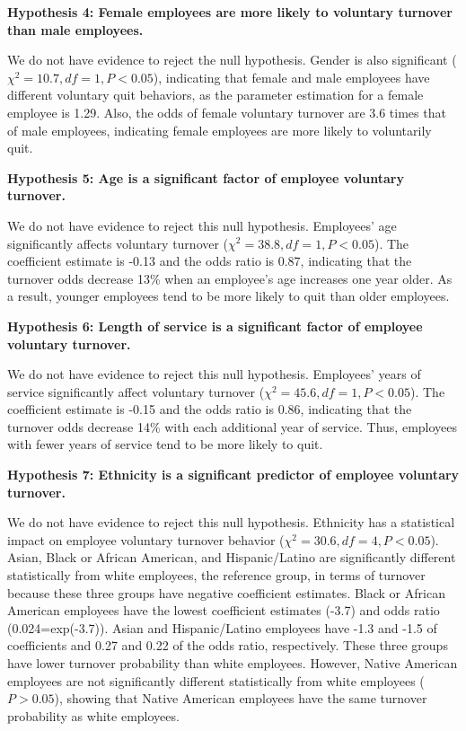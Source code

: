 \textbf{Hypothesis 4: Female employees are more likely to voluntary turnover than male employees. }

We do not have evidence to reject the null hypothesis. Gender is also significant ($\chi^2=10.7, df=1, P<0.05$), indicating that female and male employees have different voluntary quit behaviors, as the parameter estimation for a female employee is 1.29. Also, the odds of female voluntary turnover are 3.6 times that of male employees, indicating female employees are more likely to voluntarily quit. 

\textbf{Hypothesis 5: Age is a significant factor of employee voluntary turnover.}

We do not have evidence to reject this null hypothesis. Employees' age significantly affects voluntary turnover ($\chi^2=38.8, df=1, P<0.05$). The coefficient estimate is -0.13 and the odds ratio is 0.87, indicating that the turnover odds decrease 13\% when an employee's age increases one year older. As a result, younger employees tend to be more likely to quit than older employees.    

\textbf{Hypothesis 6: Length of service is a significant factor of employee voluntary turnover.}

We do not have evidence to reject this null hypothesis. Employees' years of service significantly affect voluntary turnover ($\chi^2=45.6, df=1, P<0.05$). The coefficient estimate is -0.15 and the odds ratio is 0.86, indicating that the turnover odds decrease 14\% with each additional year of service. Thus, employees with fewer years of service tend to be more likely to quit.        

\textbf{Hypothesis 7: Ethnicity is a significant predictor of employee voluntary turnover.}

We do not have evidence to reject this null hypothesis. Ethnicity has a statistical impact on employee voluntary turnover behavior ($\chi^2=30.6, df=4, P<0.05$). Asian, Black or African American, and Hispanic/Latino are significantly different statistically from white employees, the reference group, in terms of turnover because these three groups have negative coefficient estimates. Black or African American employees have the lowest coefficient estimates (-3.7) and odds ratio (0.024=exp(-3.7)). Asian and Hispanic/Latino employees have -1.3 and -1.5 of coefficients and 0.27 and 0.22 of the odds ratio, respectively. These three groups have lower turnover probability than white employees. However, Native American employees are not significantly different statistically from white employees ($P > 0.05$), showing that Native American employees have the same turnover probability as white employees. 
